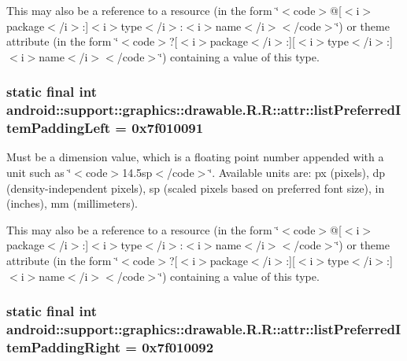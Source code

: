 This may also be a reference to a resource (in the form \char`\"{}$<$code$>$@\mbox{[}$<$i$>$package$<$/i$>$:\mbox{]}$<$i$>$type$<$/i$>$:$<$i$>$name$<$/i$>$$<$/code$>$\char`\"{}) or theme attribute (in the form \char`\"{}$<$code$>$?\mbox{[}$<$i$>$package$<$/i$>$:\mbox{]}\mbox{[}$<$i$>$type$<$/i$>$:\mbox{]}$<$i$>$name$<$/i$>$$<$/code$>$\char`\"{}) containing a value of this type. \hypertarget{classandroid_1_1support_1_1graphics_1_1drawable_1_1_r_1_1attr_65e3427eb7e3d3a86f69fc0db3d0d659}{
\subsubsection[{listPreferredItemPaddingLeft}]{\setlength{\rightskip}{0pt plus 5cm}static final int android::support::graphics::drawable.R.R::attr::listPreferredItemPaddingLeft = 0x7f010091}}
\label{classandroid_1_1support_1_1graphics_1_1drawable_1_1_r_1_1attr_65e3427eb7e3d3a86f69fc0db3d0d659}


Must be a dimension value, which is a floating point number appended with a unit such as \char`\"{}$<$code$>$14.5sp$<$/code$>$\char`\"{}. Available units are: px (pixels), dp (density-independent pixels), sp (scaled pixels based on preferred font size), in (inches), mm (millimeters). 

This may also be a reference to a resource (in the form \char`\"{}$<$code$>$@\mbox{[}$<$i$>$package$<$/i$>$:\mbox{]}$<$i$>$type$<$/i$>$:$<$i$>$name$<$/i$>$$<$/code$>$\char`\"{}) or theme attribute (in the form \char`\"{}$<$code$>$?\mbox{[}$<$i$>$package$<$/i$>$:\mbox{]}\mbox{[}$<$i$>$type$<$/i$>$:\mbox{]}$<$i$>$name$<$/i$>$$<$/code$>$\char`\"{}) containing a value of this type. \hypertarget{classandroid_1_1support_1_1graphics_1_1drawable_1_1_r_1_1attr_202a65aca6279a02740d7276c224d145}{
\subsubsection[{listPreferredItemPaddingRight}]{\setlength{\rightskip}{0pt plus 5cm}static final int android::support::graphics::drawable.R.R::attr::listPreferredItemPaddingRight = 0x7f010092}}
\label{classandroid_1_1support_1_1graphics_1_1drawable_1_1_r_1_1attr_202a65aca6279a02740d7276c224d145}



